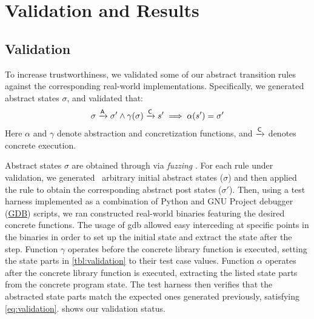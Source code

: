 \chapter{Validation and Results}
\label{ch:eicfg-validation}

\section{Validation}
To increase trustworthiness, we validated some of our abstract transition rules against the corresponding real-world implementations. Specifically, we generated abstract states $\sigma$, and validated that:
\begin{equation}
    \sigma\xrightarrow{\mathsf A}\sigma'\land\gamma(\sigma)\xrightarrow{\mathsf C} s'\implies\alpha(s')=\sigma' \label{eq:validation}
\end{equation}
Here $\alpha$ and $\gamma$ denote abstraction and concretization functions, and $\xrightarrow{\mathsf C}$ denotes concrete execution.

Abstract states $\sigma$ are obtained through via \emph{fuzzing} \autocite{quickcheck}.
For each rule under validation, we generated \fuzzcount\ arbitrary initial abstract states ($\sigma$) and then applied the rule to obtain the corresponding abstract post states ($\sigma'$).
Then, using a test harness implemented as a combination of Python and GNU Project debugger (\href{https://www.sourceware.org/gdb/}{GDB}) scripts, we ran constructed real-world binaries featuring the desired concrete functions.
The usage of \acs{gdb} allowed easy interceding at specific points in the binaries in order to set up the initial state and extract the state after the step.
Function $\gamma$ operates before the concrete library function is executed, setting the state parts in \cref{tbl:validation} to their test case values.
Function $\alpha$ operates after the concrete library function is executed, extracting the listed state parts from the concrete program state.
The test harness then verifies that the abstracted state parts match the expected ones generated previously, satisfying \cref{eq:validation}.
 shows our validation status.

